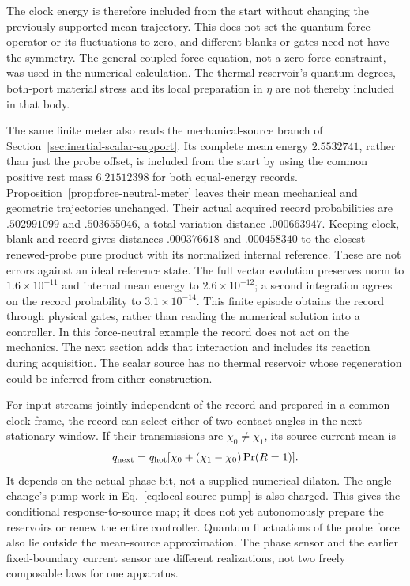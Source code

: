 \documentclass[12pt,a4paper]{article}
\begin{document}
The clock energy is therefore included from the start without changing
the previously supported mean trajectory. This does not set the quantum
force operator or its fluctuations to zero, and different blanks or
gates need not have the symmetry. The general coupled force equation,
not a zero-force constraint, was used in the numerical calculation.
The thermal reservoir's quantum degrees, both-port material stress and
its local preparation in $\eta$ are not thereby included in that body.

The same finite meter also reads the mechanical-source branch of
Section~\ref{sec:inertial-scalar-support}. Its complete mean energy
$2.5532741$, rather than just the probe offset, is included from the
start by using the common positive rest mass $6.21512398$ for both
equal-energy records. Proposition~\ref{prop:force-neutral-meter} leaves
their mean mechanical and geometric trajectories unchanged.
Their actual acquired record probabilities are $.502991099$ and
$.503655046$, a total variation distance $.000663947$.
Keeping clock, blank and record gives distances $.000376618$ and
$.000458340$ to the closest renewed-probe pure product with its normalized
internal reference. These are not errors against an ideal reference
state. The full vector evolution preserves norm to $1.6\times10^{-11}$
and internal mean energy to $2.6\times10^{-12}$; a second integration
agrees on the record probability to $3.1\times10^{-14}$.
This finite episode obtains the record through physical gates, rather
than reading the numerical solution into a controller. In this force-neutral
example the record does not act on the mechanics. The next section adds
that interaction and includes its reaction during acquisition. The scalar
source has no thermal reservoir whose regeneration could be inferred
from either construction.

For input streams jointly independent of the record and prepared in a
common clock frame, the record can select
either of two contact angles in the next stationary window.
If their transmissions are $\chi_0\ne\chi_1$, its
source-current mean is
\[
 q_{\rm next}=q_{\rm hot}[\chi_0+(\chi_1-\chi_0)\Pr(R=1)].
\]
It depends on the actual phase bit, not a supplied numerical dilaton.
The angle change's pump work in Eq.~\eqref{eq:local-source-pump} is
also charged. This gives the conditional response-to-source map;
it does not yet autonomously prepare the reservoirs or renew the
entire controller. Quantum fluctuations
of the probe force also lie outside the mean-source approximation.
The phase sensor and the earlier fixed-boundary current sensor are
different realizations, not two freely composable laws for one apparatus.
\end{document}
